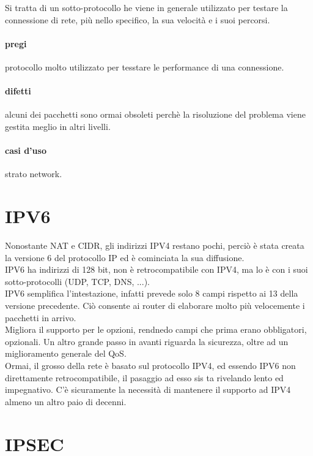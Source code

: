 \documentclass{article}
\begin{document}
Si tratta di un sotto-protocollo he viene in generale utilizzato per testare la
connessione di rete, più nello specifico, la sua velocità e i suoi percorsi.

\paragraph{pregi} protocollo molto utilizzato per tesstare le performance di una
connessione.

\paragraph{difetti} alcuni dei pacchetti sono ormai obsoleti perchè la
risoluzione del problema viene gestita meglio in altri livelli.

\paragraph{casi d'uso} strato network.

\section{IPV6}

Nonostante NAT e CIDR, gli indirizzi IPV4 restano pochi, perciò è stata creata
la versione 6 del protocollo IP ed è cominciata la sua diffusione.\\
IPV6 ha indirizzi di 128 bit, non è retrocompatibile con IPV4, ma lo è con i
suoi sotto-protocolli (UDP, TCP, DNS, ...).\\
IPV6 semplifica l'intestazione, infatti prevede solo 8 campi rispetto ai 13
della versione precedente. Ciò consente ai router di elaborare molto più
velocemente i pacchetti in arrivo.\\
Migliora il supporto per le opzioni, rendnedo campi che prima erano obbligatori,
opzionali. Un altro grande passo in avanti riguarda la sicurezza, oltre ad un
miglioramento generale del QoS.\\
Ormai, il grosso della rete è basato sul protocollo IPV4, ed essendo IPV6 non
direttamente retrocompatibile, il pasaggio ad esso sis ta rivelando lento ed
impegnativo. C'è sicuramente la necessità di mantenere il supporto ad IPV4
almeno un altro paio di decenni.

\section{IPSEC}
\end{document}
